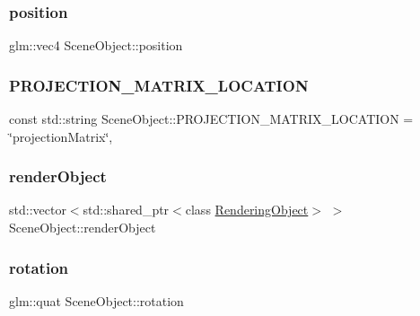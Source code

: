 \subsubsection{\texorpdfstring{position}{position}}
{\footnotesize\ttfamily glm\+::vec4 Scene\+Object\+::position\hspace{0.3cm}{\ttfamily [protected]}}

\hypertarget{class_scene_object_ad9a8c9c39a4a262c5e379c0bda184541}{}\label{class_scene_object_ad9a8c9c39a4a262c5e379c0bda184541}
\subsubsection{\texorpdfstring{P\+R\+O\+J\+E\+C\+T\+I\+O\+N\+\_\+\+M\+A\+T\+R\+I\+X\+\_\+\+L\+O\+C\+A\+T\+I\+ON}{PROJECTION\_MATRIX\_LOCATION}}
{\footnotesize\ttfamily const std\+::string Scene\+Object\+::\+P\+R\+O\+J\+E\+C\+T\+I\+O\+N\+\_\+\+M\+A\+T\+R\+I\+X\+\_\+\+L\+O\+C\+A\+T\+I\+ON = \char`\"{}projection\+Matrix\char`\"{}\hspace{0.3cm}{\ttfamily [static]}, {\ttfamily [protected]}}

\hypertarget{class_scene_object_a4bbf98a19bd8e7ddd491fbb9a41b42cf}{}\label{class_scene_object_a4bbf98a19bd8e7ddd491fbb9a41b42cf}
\subsubsection{\texorpdfstring{render\+Object}{renderObject}}
{\footnotesize\ttfamily std\+::vector$<$std\+::shared\+\_\+ptr$<$class \hyperlink{class_rendering_object}{Rendering\+Object}$>$ $>$ Scene\+Object\+::render\+Object\hspace{0.3cm}{\ttfamily [private]}}

\hypertarget{class_scene_object_ae27376aaca87543a75b5a2cd0daf6e2f}{}\label{class_scene_object_ae27376aaca87543a75b5a2cd0daf6e2f}
\subsubsection{\texorpdfstring{rotation}{rotation}}
{\footnotesize\ttfamily glm\+::quat Scene\+Object\+::rotation\hspace{0.3cm}{\ttfamily [protected]}}

